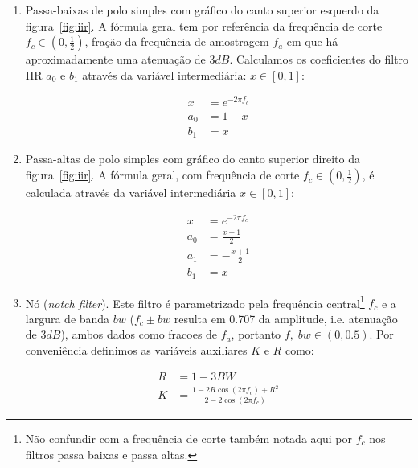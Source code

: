 \begin{enumerate}
\item Passa-baixas de polo simples com gráfico do canto superior esquerdo da figura~\ref{fig:iir}. A fórmula geral tem
por referência da frequência de corte $f_c \in (0,\frac{1}{2})$,
fração da frequência de amostragem $f_a$
em que há aproximadamente uma atenuação de $3dB$.
Calculamos os coeficientes do filtro IIR
$a_0$ e $b_1$ 
através da variável intermediária: $x \in [0,1]$:

\begin{equation}\label{eq:passa-baixas}
\begin{split}
x & =e^{-2\pi f_c} \\
a_0 & =  1-x \\
b_1 & =  x
\end{split}
\end{equation}

\item Passa-altas de polo simples com gráfico do canto superior direito da figura~\ref{fig:iir}. A fórmula geral,
com frequência de corte $f_c \in (0,\frac{1}{2})$, é calculada através da variável
intermediária $x \in [0,1]$:


\begin{equation}\label{eq:passa-altas}
\begin{split}
x & =e^{-2\pi f_c} \\
a_0 & =  \frac{x+1}{2} \\
a_1 & =  -\frac{x+1}{2} \\
b_1 & =  x
\end{split}
\end{equation}


\item Nó (\emph{notch filter}). Este filtro é parametrizado
pela frequência central\footnote{Não
confundir com a frequência de corte também notada aqui por $f_c$ nos filtros passa baixas e passa altas.} $f_c$
e a largura de banda $bw$
($f_c \pm bw$ resulta em 0.707 da amplitude, i.e. atenuação de $3dB$),
ambos dados como fracoes de $f_a$, portanto $f,\; bw \in (0,0.5)$.
Por conveniência definimos as variáveis auxiliares $K$ e $R$ como:

\begin{equation}
\begin{split}
R & = 1 - 3BW \\
K & = \frac{1-2R\cos(2\pi f_c) + R^2}{2 - 2 \cos (2 \pi f_c)}
\end{split}
\end{equation}


\end{enumerate}

